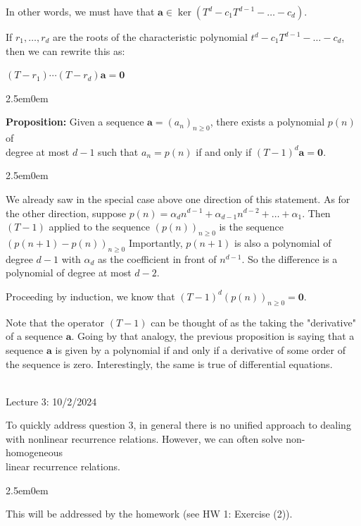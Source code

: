 \documentclass{book}
\newcommand{\hTwo}{%
\color{MidnightBlue}%
   \fontsize{13}{15}\selectfont%
}
\newcommand{\hThree}{%
   \color{PineGreen!85!Orange}
   \fontsize{12}{14}\selectfont%
}
\newcommand{\exOne}{%
   \color{Purple}%
   \fontsize{13}{15}\selectfont%
}
\newenvironment{myIndent}{%
   \begin{adjustwidth}{2.5em}{0em}%
}{%
   \end{adjustwidth}%
}
\newcommand{\blab}[1]{\textbf{#1}}
\newcommand{\mySepTwo}[1][.]{%
   {\noindent\color{#1}{\rule{6.5in}{0.5mm}}}\\%
}
\newcommand{\retTwo}{\hfill\bigbreak}
\newcommand{\mHeader}[1]{{
   \color{Black}%
   \fontsize{20}{18}\selectfont%
   #1\retTwo
}}
\begin{document}
In other words, we must have that $\bm{a} \in \ker(T^d - c_1T^{d-1} - \ldots - c_d)$.\retTwo

If $r_1, \ldots, r_d$ are the roots of the characteristic polynomial $t^d - c_1T^{d-1} - \ldots - c_d$, then we can rewrite this as:

{\centering $(T - r_1)\cdots(T - r_d)\bm{a} = \bm{0}$ \retTwo\par}

\begin{myIndent}\hTwo
   \blab{Proposition:} Given a sequence $\bm{a} = (a_n)_{n \geq 0}$, there exists a polynomial $p(n)$ of\\ degree at most $d - 1$ such that $a_n = p(n)$ if and only if $(T - 1)^d\bm{a} = \bm{0}$.

   \begin{myIndent}\hThree
      We already saw in the special case above one direction of this statement. As for the other direction, suppose $p(n) = \alpha_d n^{d-1} + \alpha_{d-1}n^{d-2} + \ldots + \alpha_1$. Then $(T - 1)$ applied to the sequence $(p(n))_{n\geq 0}$ is the sequence $(p(n + 1) - p(n))_{n \geq 0}$ Importantly, $p(n + 1)$ is also a polynomial of degree $d - 1$ with $\alpha_d$ as the coefficient in front of $n^{d - 1}$. So the difference is a polynomial of degree at most $d - 2$.\newpage

      Proceeding by induction, we know that $(T - 1)^d(p(n))_{n\geq 0} = \bm{0}$.\retTwo
   \end{myIndent}   
\end{myIndent}

Note that the operator $(T - 1)$ can be thought of as the taking the "derivative" of a sequence $\bm{a}$. Going by that analogy, the previous proposition is saying that a sequence $\bm{a}$ is given by a polynomial if and only if a derivative of some order of the sequence is zero. Interestingly, the same is true of differential equations.\retTwo

\mySepTwo

\mHeader{Lecture 3: 10/2/2024}

To quickly address question 3, in general there is no unified approach to dealing with nonlinear recurrence relations. However, we can often solve non-homogeneous\\ linear recurrence relations.
\begin{myIndent}\exOne
   This will be addressed by the homework (see HW 1: Exercise (2)).\retTwo
\end{myIndent}
\end{document}
